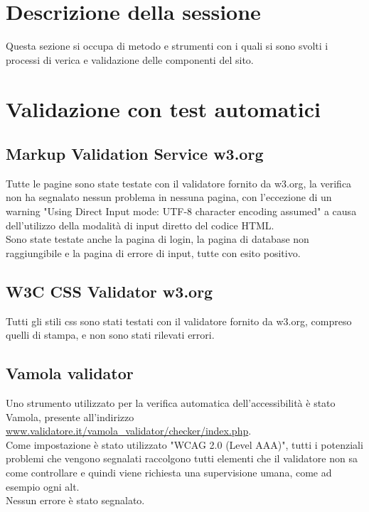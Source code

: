 \documentclass[openany, a4paper, 12pt]{report}
\begin{document}
		\section{Descrizione della sessione}
			Questa sezione si occupa di metodo e strumenti con i quali si sono svolti i processi di verica e validazione delle componenti del sito.
		\section{Validazione con test automatici}
			\subsection{Markup Validation Service w3.org}
				Tutte le pagine sono state testate con il validatore fornito da w3.org, la verifica non ha segnalato nessun problema in nessuna pagina, con l'eccezione di un warning "Using Direct Input mode: UTF-8 character encoding assumed" a causa dell'utilizzo della modalità di input diretto del codice HTML.\\
				Sono state testate anche la pagina di login, la pagina di database non raggiungibile e la pagina di errore di input, tutte con esito positivo.
			\subsection{W3C CSS Validator w3.org}
				Tutti gli stili css sono stati testati con il validatore fornito da w3.org, compreso quelli di stampa, e non sono stati rilevati errori.
			\subsection{Vamola validator}
				Uno strumento utilizzato per la verifica automatica dell'accessibilità è stato Vamola, presente all'indirizzo \url{www.validatore.it/vamola_validator/checker/index.php}.\\
				Come impostazione è stato utilizzato "WCAG 2.0 (Level AAA)", tutti i potenziali problemi che vengono segnalati raccolgono tutti elementi che il validatore non sa come controllare e quindi viene richiesta una supervisione umana, come ad esempio ogni alt.\\
				Nessun errore è stato segnalato.
\end{document}

